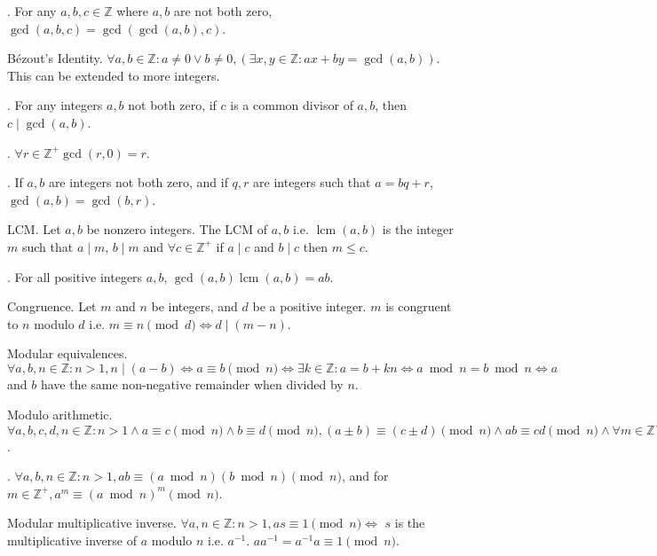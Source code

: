 \documentclass{slnotes}
\DeclareMathOperator{\lcm}{lcm}
\begin{document}
. For any \(a, b, c \in \mathbb{Z}\) where \(a, b\) are not both zero, \(\gcd(a, b, c) = \gcd(\gcd(a, b), c)\).

 Bézout's Identity. \(\forall a, b \in \mathbb{Z} : a \neq 0 \lor b \neq 0, (\exists x, y \in \mathbb{Z} : ax + by = \gcd(a, b))\). This can be extended to more integers.

. For any integers \(a, b\) not both zero, if \(c\) is a common divisor of \(a, b\), then \(c \mid \gcd(a, b)\).

. \(\forall r \in \mathbb{Z}^+ \gcd(r, 0) = r\).

. If \(a, b\) are integers not both zero, and if \(q, r\) are integers such that \(a = bq + r\), \(\gcd(a, b) = \gcd(b, r)\).

 LCM. Let \(a, b\) be nonzero integers. The LCM of \(a, b\) i.e. \(\lcm(a, b)\) is the integer \(m\) such that \(a \mid m\), \(b \mid m\) and \(\forall c \in \mathbb{Z}^+\) if \(a \mid c\) and \(b \mid c\) then \(m \le c\).

. For all positive integers \(a, b\), \(\gcd(a, b)\lcm(a, b) = ab\).

 Congruence. Let \(m\) and \(n\) be integers, and \(d\) be a positive integer. \(m\) is congruent to \(n\) modulo \(d\) i.e. \(m \equiv n \pmod d \Leftrightarrow d \mid (m - n)\).

 Modular equivalences. \(\forall a,b,n \in \mathbb{Z} : n > 1, n \mid (a - b) \Leftrightarrow a \equiv b \pmod n \Leftrightarrow \exists k \in \mathbb{Z} : a = b + kn \Leftrightarrow a \bmod n = b \bmod n \Leftrightarrow a\) and \(b\) have the same non-negative remainder when divided by \(n\).

 Modulo arithmetic. \(\forall a,b,c,d,n \in \mathbb{Z} : n > 1 \land a \equiv c \pmod n \land b \equiv d \pmod n, (a \pm b) \equiv (c \pm d) \pmod n \land ab \equiv cd \pmod n \land \forall m \in \mathbb{Z}^+, a^m \equiv c^m\).

. \(\forall a,b,n \in \mathbb{Z} : n > 1, ab \equiv (a\bmod n)(b\bmod n) \pmod n\), and for \(m \in \mathbb{Z}^+, a^m \equiv (a\bmod n)^m \pmod n\).

 Modular multiplicative inverse. \(\forall a, n \in \mathbb{Z} : n > 1, as \equiv 1 \pmod n \Leftrightarrow\) \(s\) is the multiplicative inverse of \(a\) modulo \(n\) i.e. \(a^{-1}\). \(aa^{-1} = a^{-1}a \equiv 1 \pmod n\).
\end{document}
